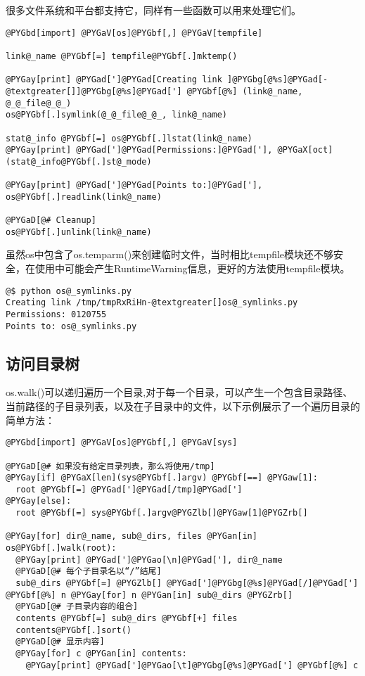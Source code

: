 \documentclass[letterpaper,10pt,english]{manual}
\begin{document}
很多文件系统和平台都支持它，同样有一些函数可以用来处理它们。

\begin{Verbatim}[commandchars=@\[\]]
@PYGbd[import] @PYGaV[os]@PYGbf[,] @PYGaV[tempfile]

link@_name @PYGbf[=] tempfile@PYGbf[.]mktemp()

@PYGay[print] @PYGad[']@PYGad[Creating link ]@PYGbg[@%s]@PYGad[-@textgreater[]]@PYGbg[@%s]@PYGad['] @PYGbf[@%] (link@_name, @_@_file@_@_)
os@PYGbf[.]symlink(@_@_file@_@_, link@_name)

stat@_info @PYGbf[=] os@PYGbf[.]lstat(link@_name)
@PYGay[print] @PYGad[']@PYGad[Permissions:]@PYGad['], @PYGaX[oct](stat@_info@PYGbf[.]st@_mode)

@PYGay[print] @PYGad[']@PYGad[Points to:]@PYGad['], os@PYGbf[.]readlink(link@_name)

@PYGaD[@# Cleanup]
os@PYGbf[.]unlink(link@_name)
\end{Verbatim}

虽然os中包含了os.temparm()来创建临时文件，当时相比tempfile模块还不够安全，在使用中可能会产生RuntimeWarning信息，更好的方法使用tempfile模块。

\begin{Verbatim}[commandchars=@\[\]]
@$ python os@_symlinks.py
Creating link /tmp/tmpRxRiHn-@textgreater[]os@_symlinks.py
Permissions: 0120755
Points to: os@_symlinks.py
\end{Verbatim}


\subsection{访问目录树}

os.walk()可以递归遍历一个目录,对于每一个目录，可以产生一个包含目录路径、当前路径的子目录列表，以及在子目录中的文件，以下示例展示了一个遍历目录的简单方法：

\begin{Verbatim}[commandchars=@\[\]]
@PYGbd[import] @PYGaV[os]@PYGbf[,] @PYGaV[sys]

@PYGaD[@# 如果没有给定目录列表，那么将使用/tmp]
@PYGay[if] @PYGaX[len](sys@PYGbf[.]argv) @PYGbf[==] @PYGaw[1]:
  root @PYGbf[=] @PYGad[']@PYGad[/tmp]@PYGad[']
@PYGay[else]:
  root @PYGbf[=] sys@PYGbf[.]argv@PYGZlb[]@PYGaw[1]@PYGZrb[]

@PYGay[for] dir@_name, sub@_dirs, files @PYGan[in] os@PYGbf[.]walk(root):
  @PYGay[print] @PYGad[']@PYGao[\n]@PYGad['], dir@_name
  @PYGaD[@# 每个子目录名以“/”结尾]
  sub@_dirs @PYGbf[=] @PYGZlb[] @PYGad[']@PYGbg[@%s]@PYGad[/]@PYGad['] @PYGbf[@%] n @PYGay[for] n @PYGan[in] sub@_dirs @PYGZrb[]
  @PYGaD[@# 子目录内容的组合]
  contents @PYGbf[=] sub@_dirs @PYGbf[+] files
  contents@PYGbf[.]sort()
  @PYGaD[@# 显示内容]
  @PYGay[for] c @PYGan[in] contents:
    @PYGay[print] @PYGad[']@PYGao[\t]@PYGbg[@%s]@PYGad['] @PYGbf[@%] c
\end{Verbatim}
\end{document}
